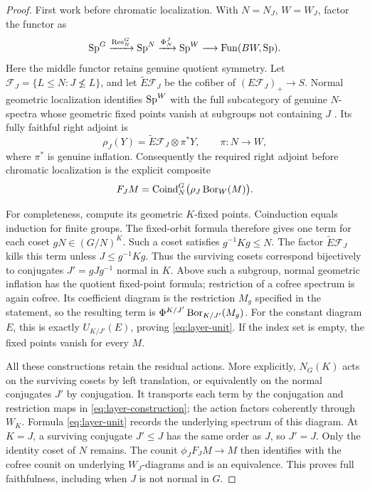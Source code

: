 \begin{proof}
First work before chromatic localization. With \(N=N_J\), \(W=W_J\),
factor the functor as
\[
 \mathrm{Sp}^G\xrightarrow{\operatorname{Res}_N^G}\mathrm{Sp}^N
 \xrightarrow{\Phi_N^J}\mathrm{Sp}^W
 \longrightarrow\operatorname{Fun}(BW,\mathrm{Sp}).
\]
Here the middle functor retains genuine quotient symmetry. Let
\(\mathscr F_J=\{L\le N:J\not\le L\}\), and let
\(\widetilde E\mathscr F_J\) be the cofiber of
\((E\mathscr F_J)_+\to S\). Normal geometric localization identifies
\(\mathrm{Sp}^W\) with the full subcategory of genuine \(N\)-spectra whose
geometric fixed points vanish at subgroups not containing \(J\)
\cite[Section~2\textup{(H)}]{BS}. Its fully faithful right adjoint is
\[
 \rho_J(Y)=\widetilde E\mathscr F_J\otimes\pi^*Y,
 \qquad \pi:N\longrightarrow W,
\]
where \(\pi^*\) is genuine inflation. Consequently the required right
adjoint before chromatic localization is the explicit composite
\begin{equation}\label{eq:layer-construction}
 F_JM=\operatorname{Coind}_{N}^{G}\bigl(\rho_J\operatorname{Bor}_W(M)\bigr).
\end{equation}

For completeness, compute its geometric \(K\)-fixed points. Coinduction
equals induction for finite groups. The fixed-orbit formula therefore gives
one term for each coset \(gN\in(G/N)^K\). Such a coset satisfies
\(g^{-1}Kg\le N\). The factor \(\widetilde E\mathscr F_J\) kills this
term unless \(J\le g^{-1}Kg\). Thus the surviving cosets correspond
bijectively to conjugates \(J'=gJg^{-1}\) normal in \(K\). Above such a
subgroup, normal geometric inflation has the quotient fixed-point formula;
restriction of a cofree spectrum is again cofree. Its coefficient diagram
is the restriction \(M_g\) specified in the statement, so the resulting
term is \(\Phi^{K/J'}\operatorname{Bor}_{K/J'}(M_g)\). For the constant diagram
\(E\), this is exactly \(U_{K/J'}(E)\), proving
\eqref{eq:layer-unit}. If the index set is empty, the fixed points vanish
for every \(M\).

All these constructions retain the residual actions. More explicitly,
\(N_G(K)\) acts on the surviving cosets by left translation, or equivalently
on the normal conjugates \(J'\) by conjugation. It transports each term by
the conjugation and restriction maps in \eqref{eq:layer-construction}; the
action factors coherently through \(W_K\). Formula
\eqref{eq:layer-unit} records the underlying spectrum of this diagram.
At \(K=J\), a surviving conjugate \(J'\le J\) has the same order as
\(J\), so \(J'=J\). Only the identity coset of \(N\) remains. The
counit \(\phi_JF_JM\to M\) then identifies with the cofree counit on
underlying \(W_J\)-diagrams and is an equivalence. This proves full
faithfulness, including when \(J\) is not normal in \(G\).


\end{proof}
